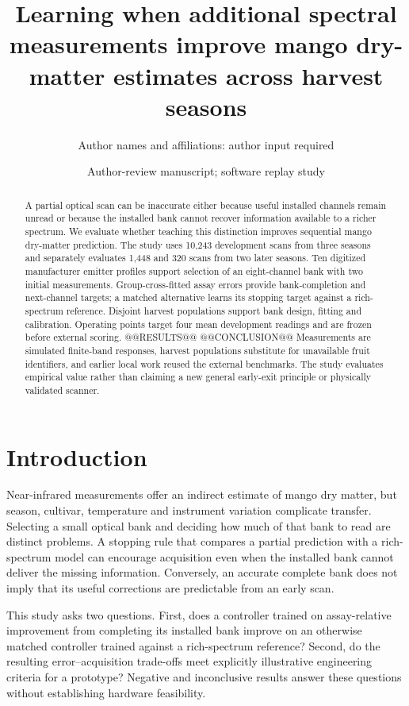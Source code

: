 \documentclass[11pt,a4paper]{article}
\title{Learning when additional spectral measurements improve mango dry-matter estimates across harvest seasons}
\author{Author names and affiliations: author input required}
\date{Author-review manuscript; software replay study}
\begin{document}
\maketitle
\begin{abstract}
A partial optical scan can be inaccurate either because useful installed channels remain unread or because the installed bank cannot recover information available to a richer spectrum. We evaluate whether teaching this distinction improves sequential mango dry-matter prediction. The study uses 10,243 development scans from three seasons and separately evaluates 1,448 and 320 scans from two later seasons. Ten digitized manufacturer emitter profiles support selection of an eight-channel bank with two initial measurements. Group-cross-fitted assay errors provide bank-completion and next-channel targets; a matched alternative learns its stopping target against a rich-spectrum reference. Disjoint harvest populations support bank design, fitting and calibration. Operating points target four mean development readings and are frozen before external scoring. @@RESULTS@@ @@CONCLUSION@@ Measurements are simulated finite-band responses, harvest populations substitute for unavailable fruit identifiers, and earlier local work reused the external benchmarks. The study evaluates empirical value rather than claiming a new general early-exit principle or physically validated scanner.
\end{abstract}

\section{Introduction}
Near-infrared measurements offer an indirect estimate of mango dry matter, but season, cultivar, temperature and instrument variation complicate transfer. Selecting a small optical bank and deciding how much of that bank to read are distinct problems. A stopping rule that compares a partial prediction with a rich-spectrum model can encourage acquisition even when the installed bank cannot deliver the missing information. Conversely, an accurate complete bank does not imply that its useful corrections are predictable from an early scan.

This study asks two questions. First, does a controller trained on assay-relative improvement from completing its installed bank improve on an otherwise matched controller trained against a rich-spectrum reference? Second, do the resulting error--acquisition trade-offs meet explicitly illustrative engineering criteria for a prototype? Negative and inconclusive results answer these questions without establishing hardware feasibility.
\end{document}
